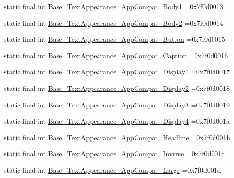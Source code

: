 \begin{DoxyCompactItemize}
static final int \mbox{\hyperlink{classbr_1_1unb_1_1cic_1_1mp_1_1marketmaster_1_1R_1_1style_a40276df68102fb2d0da8d6fbb52955d6}{Base\+\_\+\+Text\+Appearance\+\_\+\+App\+Compat\+\_\+\+Body1}} =0x7f0d0013
\item 
static final int \mbox{\hyperlink{classbr_1_1unb_1_1cic_1_1mp_1_1marketmaster_1_1R_1_1style_a99c0f24a6b1806fff878f75bf67ee72b}{Base\+\_\+\+Text\+Appearance\+\_\+\+App\+Compat\+\_\+\+Body2}} =0x7f0d0014
\item 
static final int \mbox{\hyperlink{classbr_1_1unb_1_1cic_1_1mp_1_1marketmaster_1_1R_1_1style_ada11272b36832c7889026305d0369c79}{Base\+\_\+\+Text\+Appearance\+\_\+\+App\+Compat\+\_\+\+Button}} =0x7f0d0015
\item 
static final int \mbox{\hyperlink{classbr_1_1unb_1_1cic_1_1mp_1_1marketmaster_1_1R_1_1style_a33a7fe2d990dcc23c090291eb244d6b2}{Base\+\_\+\+Text\+Appearance\+\_\+\+App\+Compat\+\_\+\+Caption}} =0x7f0d0016
\item 
static final int \mbox{\hyperlink{classbr_1_1unb_1_1cic_1_1mp_1_1marketmaster_1_1R_1_1style_a2cca1e2733585e56e1129d3689181d6e}{Base\+\_\+\+Text\+Appearance\+\_\+\+App\+Compat\+\_\+\+Display1}} =0x7f0d0017
\item 
static final int \mbox{\hyperlink{classbr_1_1unb_1_1cic_1_1mp_1_1marketmaster_1_1R_1_1style_a2c7ca05bf9bfdf2bd14d49774e540f44}{Base\+\_\+\+Text\+Appearance\+\_\+\+App\+Compat\+\_\+\+Display2}} =0x7f0d0018
\item 
static final int \mbox{\hyperlink{classbr_1_1unb_1_1cic_1_1mp_1_1marketmaster_1_1R_1_1style_a90db089a770013b9b466e5a8481a8379}{Base\+\_\+\+Text\+Appearance\+\_\+\+App\+Compat\+\_\+\+Display3}} =0x7f0d0019
\item 
static final int \mbox{\hyperlink{classbr_1_1unb_1_1cic_1_1mp_1_1marketmaster_1_1R_1_1style_a218c4b67cd2bc2ca7b0b2368cc5b3f58}{Base\+\_\+\+Text\+Appearance\+\_\+\+App\+Compat\+\_\+\+Display4}} =0x7f0d001a
\item 
static final int \mbox{\hyperlink{classbr_1_1unb_1_1cic_1_1mp_1_1marketmaster_1_1R_1_1style_a96cb2d2e6c3b9db6139956a36b9e1e08}{Base\+\_\+\+Text\+Appearance\+\_\+\+App\+Compat\+\_\+\+Headline}} =0x7f0d001b
\item 
static final int \mbox{\hyperlink{classbr_1_1unb_1_1cic_1_1mp_1_1marketmaster_1_1R_1_1style_ab148fe03dd95350a048931229e085b5d}{Base\+\_\+\+Text\+Appearance\+\_\+\+App\+Compat\+\_\+\+Inverse}} =0x7f0d001c
\item 
static final int \mbox{\hyperlink{classbr_1_1unb_1_1cic_1_1mp_1_1marketmaster_1_1R_1_1style_a2f8a75acb4845751a1b8bb8cba3faa7e}{Base\+\_\+\+Text\+Appearance\+\_\+\+App\+Compat\+\_\+\+Large}} =0x7f0d001d

\end{DoxyCompactItemize}
